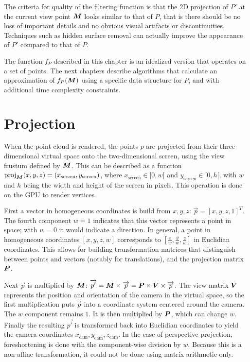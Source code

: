 \documentclass[a4paper,10pt,abstracton,notitlepage]{scrreprt}
\begin{document}
The criteria for quality of the filtering function is that the 2D projection of $P'$ at the current view point $\matrixsym{M}$ looks similar to that of $P$, that is there should be no loss of important details and no obvious visual artifacts or discontinuities. Techniques such as hidden surface removal can actually improve the appearance of $P'$ compared to that of $P$.

The function $f_{P}$ described in this chapter is an idealized version that operates on a set of points. The next chapters describe algorithms that calculate an approximation of $f_{P}(\matrixsym{M})$ using a specific data structure for $P$, and with additional time complexity constraints.


\section{Projection}
When the point cloud is rendered, the points $p$ are projected from their three-dimensional virtual space onto the two-dimensional screen, using the view frustum defined by $\matrixsym{M}$. This can be described as a function $\mathrm{proj}_{\matrixsym{M}}(x, y, z) = (x_{\mathrm{screen}}, y_{\mathrm{screen}})$, where $x_{\mathrm{screen}} \in [0, w[$ and $y_{\mathrm{screen}} \in [0, h[$, with $w$ and $h$ being the width and height of the screen in pixels. This operation is done on the GPU to render vertices.

First a vector in homogeneous coordinates is build from $x, y, z$: $\overrightarrow{p} = [x, y, z, 1]^{T}$. The fourth component $w = 1$ indicates that this vector represents a point in space; with $w = 0$ it would indicate a direction. In general, a point in homogeneous coordinates $[x, y, z, w]$ corresponds to $[\frac{x}{w}, \frac{y}{w}, \frac{z}{w}]$ in Euclidian coordinates. This allows for building transformation matrices that distinguish between points and vectors (notably for translations), and the projection matrix $\matrixsym{P}$.

Next $\overrightarrow{p}$ is multiplied by $\matrixsym{M}$: $\overrightarrow{p'} = \matrixsym{M} \times \overrightarrow{p} = \matrixsym{P} \times \matrixsym{V} \times \overrightarrow{p}$. The view matrix $\matrixsym{V}$ represents the position and orientation of the camera in the virtual space, so the first multiplication puts $\overrightarrow{p}$ into a coordinate system centered around the camera. The $w$ component remains $1$. It is then multiplied by $\matrixsym{P}$, which can change $w$. Finally the resulting $\overrightarrow{p'}$ is transformed back into Euclidian coordinates to yield the camera coordinates $x_{\mathrm{cam}}, y_{\mathrm{cam}}, z_{\mathrm{cam}}$. In the case of perspective projection, foreshortening is done with the component-wise division by $w$. Because this is a non-affine transformation, it could not be done using matrix arithmetic only.
\end{document}
